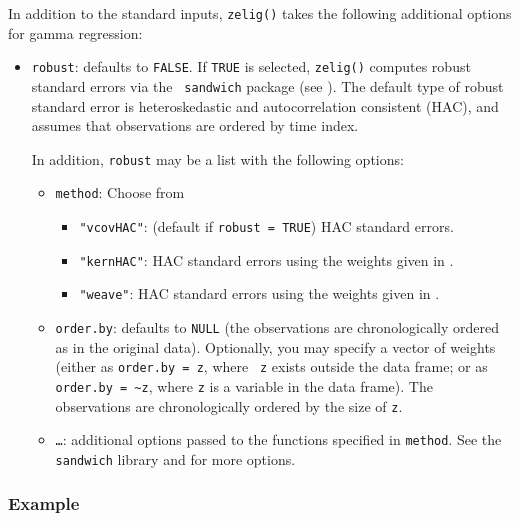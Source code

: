 \documentclass{article}
\begin{document}
In addition to the standard inputs, {\tt zelig()} takes the following
additional options for gamma regression:  
\begin{itemize}
\item {\tt robust}: defaults to {\tt FALSE}.  If {\tt TRUE} is
selected, {\tt zelig()} computes robust standard errors via the {\tt
sandwich} package (see \cite{Zeileis04}).  The default type of robust
standard error is heteroskedastic and autocorrelation consistent (HAC),
and assumes that observations are ordered by time index.

In addition, {\tt robust} may be a list with the following options:  
\begin{itemize}
\item {\tt method}:  Choose from 
\begin{itemize}
\item {\tt "vcovHAC"}: (default if {\tt robust = TRUE}) HAC standard
errors. 
\item {\tt "kernHAC"}: HAC standard errors using the
weights given in \cite{Andrews91}. 
\item {\tt "weave"}: HAC standard errors using the
weights given in \cite{LumHea99}.  
\end{itemize}  
\item {\tt order.by}: defaults to {\tt NULL} (the observations are
chronologically ordered as in the original data).  Optionally, you may
specify a vector of weights (either as {\tt order.by = z}, where {\tt
z} exists outside the data frame; or as {\tt order.by = \~{}z}, where
{\tt z} is a variable in the data frame).  The observations are
chronologically ordered by the size of {\tt z}.
\item {\tt \dots}:  additional options passed to the functions 
specified in {\tt method}.   See the {\tt sandwich} library and
\cite{Zeileis04} for more options.   
\end{itemize}
\end{itemize}

\subsubsection{Example}
\end{document}
